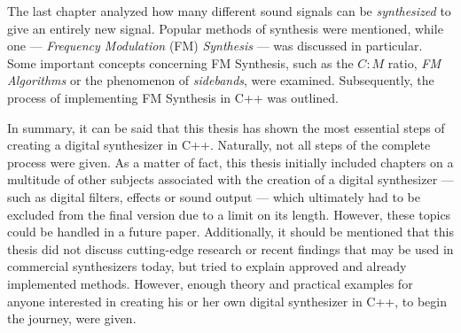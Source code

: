 The last chapter analyzed how many different sound signals can be \emph{synthesized} to give an entirely new signal. Popular methods of synthesis were mentioned, while one --- \emph{Frequency Modulation} (FM) \emph{Synthesis} --- was discussed in particular. Some important concepts concerning FM Synthesis, such as the $C:M$ ratio, \emph{FM Algorithms} or the phenomenon of \emph{sidebands}, were examined. Subsequently, the process of implementing FM Synthesis in C++ was outlined.

\pagebreak

In summary, it can be said that this thesis has shown the most essential steps of creating a digital synthesizer in C++. Naturally, not all steps of the complete process were given. As a matter of fact, this thesis initially included chapters on a multitude of other subjects associated with the creation of a digital synthesizer --- such as digital filters, effects or sound output --- which ultimately had to be excluded from the final version due to a limit on its length. However, these topics could be handled in a future paper. Additionally, it should be mentioned that this thesis did not discuss cutting-edge research or recent findings that may be used in commercial synthesizers today, but tried to explain approved and already implemented methods. However, enough theory and practical examples for anyone interested in creating his or her own digital synthesizer in C++, to begin the journey, were given.
